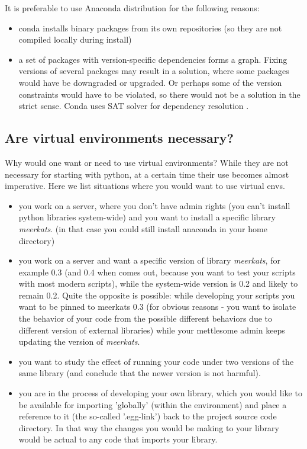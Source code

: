 \documentclass[article]{revtex4}
\begin{document}
It is preferable to use Anaconda distribution for the following reasons:
\begin{itemize}
    \item conda installs binary packages from its own repositories (so they are not compiled locally during install)
    \item a set of packages with version-specific dependencies forms a graph. Fixing versions of several packages may result in a solution, where some packages would have be downgraded or upgraded. Or perhaps some of the version constraints would have to be violated, so there would not be a solution in the strict sense. Conda uses SAT solver for dependency resolution \cite{satsolver}.
\end{itemize}

\subsection{Are virtual environments necessary?}
Why would one want or need to use virtual environments? While they are not necessary for starting with python, at a certain time their use becomes almost imperative. Here we list situations where you would want to use virtual envs.

\begin{itemize}
    \item you work on a server, where you don't have admin rights (you can't install python libraries system-wide) and you want to install a specific library {\it meerkats}. (in that case you could still install anaconda in your home directory)

    \item you work on a server and want a specific version of library {\it meerkats}, for example 0.3 (and 0.4 when comes out, because you want to test your scripts with most modern scripts), while the system-wide version is 0.2 and likely to remain 0.2. Quite the opposite is possible: while developing your scripts you want to be pinned to meerkats 0.3 (for obvious reasons - you want to isolate the behavior of your code from the possible different behaviors due to different version of external libraries) while your mettlesome admin keeps updating the version of {\it meerkats}.

    \item you want to study the effect of running your code under two versions of the same library (and conclude that the newer version is not harmful).

    \item you are in the process of developing your own library, which you would like to be available for importing 'globally' (within the environment) and place a reference to it (the so-called '.egg-link') back to the project source code directory. In that way the changes you would be making to your library would be actual to any code that imports your library.
\end{itemize}
\end{document}
